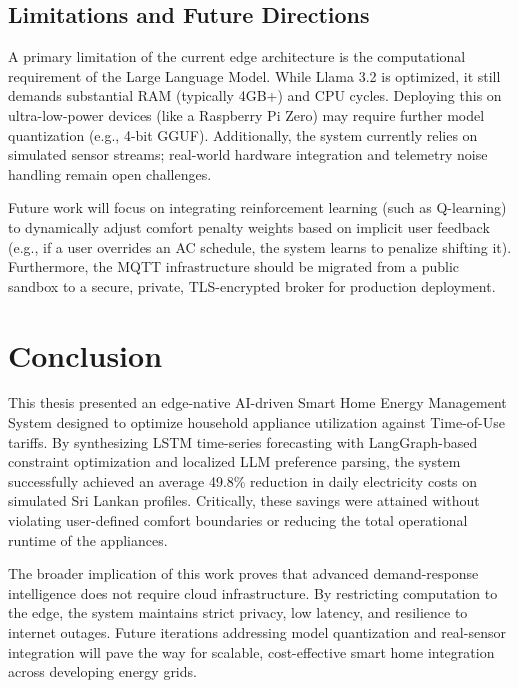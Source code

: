 \documentclass[12pt, a4paper]{article}
\begin{document}
\subsection{Limitations and Future Directions}
A primary limitation of the current edge architecture is the computational requirement of the Large Language Model. While Llama 3.2 is optimized, it still demands substantial RAM (typically 4GB+) and CPU cycles. Deploying this on ultra-low-power devices (like a Raspberry Pi Zero) may require further model quantization (e.g., 4-bit GGUF). Additionally, the system currently relies on simulated sensor streams; real-world hardware integration and telemetry noise handling remain open challenges. 

Future work will focus on integrating reinforcement learning (such as Q-learning) to dynamically adjust comfort penalty weights based on implicit user feedback (e.g., if a user overrides an AC schedule, the system learns to penalize shifting it). Furthermore, the MQTT infrastructure should be migrated from a public sandbox to a secure, private, TLS-encrypted broker for production deployment.

\section{Conclusion}

This thesis presented an edge-native AI-driven Smart Home Energy Management System designed to optimize household appliance utilization against Time-of-Use tariffs. By synthesizing LSTM time-series forecasting with LangGraph-based constraint optimization and localized LLM preference parsing, the system successfully achieved an average 49.8\% reduction in daily electricity costs on simulated Sri Lankan profiles. Critically, these savings were attained without violating user-defined comfort boundaries or reducing the total operational runtime of the appliances.

The broader implication of this work proves that advanced demand-response intelligence does not require cloud infrastructure. By restricting computation to the edge, the system maintains strict privacy, low latency, and resilience to internet outages. Future iterations addressing model quantization and real-sensor integration will pave the way for scalable, cost-effective smart home integration across developing energy grids.
\end{document}
